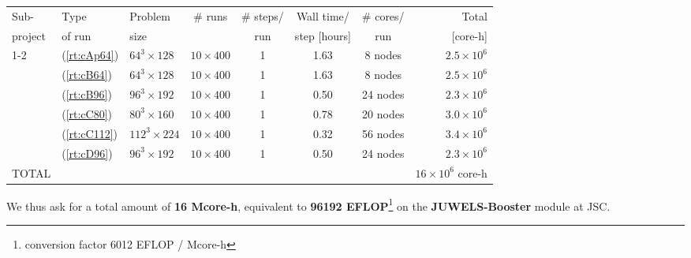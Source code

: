 \begin{center}
	{\small
		\begin{tabular}{lllccccr} \hline\hline
			Sub- &
			Type &
			Problem &
			\# runs &
			\# steps/ &
			Wall time/ &
			\# cores/ &
			Total \\
			project &
			of run &
			size  &
			&
			run &
			step [hours] &
			run &
			[core-h] \\
			\hline\hline
			1-2 &(\ref{rt:cAp64}) &	$64^3\times 128$ &	$10\times 400$ &	1 &	1.63 &	8 nodes &			$2.5 \times 10^6$ \\
			&(\ref{rt:cB64}) &	$64^3\times 128$ &	$10\times 400$ &	1 &	1.63 &	8 nodes &			$2.5 \times 10^6$ \\
			&(\ref{rt:cB96}) &	$96^3\times 192$ &	$10\times 400$ &	1 &	0.50 &	24 nodes &			$2.3 \times 10^6$ \\			
			&(\ref{rt:cC80}) &	$80^3\times 160$ &	$10\times 400$ &	1 &	0.78 &	20 nodes &			$3.0 \times 10^6$ \\			
			&(\ref{rt:cC112}) &	$112^3\times 224$ &	$10\times 400$ &	1 &	0.32 &	56 nodes &			$3.4 \times 10^6$ \\			
			&(\ref{rt:cD96}) &	$96^3\times 192$ &	$10\times 400$ &	1 &	0.50 &	24 nodes &			$2.3 \times 10^6$ \\
			\hline\hline
			TOTAL & & & & & & & $16 \times 10^6$ core-h\\
		\end{tabular}
	}
\end{center}
\bigskip
We thus ask for a total amount of \textbf{16 Mcore-h}, equivalent to \textbf{96192 EFLOP}\footnote{conversion factor 6012 EFLOP / Mcore-h}  on the \textbf{JUWELS-Booster} module at JSC.

